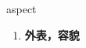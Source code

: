 
\begin{frame}
{\huge aspect}
\begin{center}
\begin{enumerate}\Large
  \item \textbf{外表，容貌}
\end{enumerate}
\end{center}
\end{frame}
